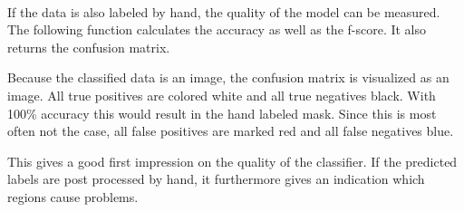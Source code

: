 \documentclass{article}
\begin{document}
    \begin{center}
    \end{center}
    { \hspace*{\fill} \\}
    
    If the data is also labeled by hand, the quality of the model can be
measured. The following function calculates the accuracy as well as the
f-score. It also returns the confusion matrix.

Because the classified data is an image, the confusion matrix is
visualized as an image. All true positives are colored white and all
true negatives black. With 100\% accuracy this would result in the hand
labeled mask. Since this is most often not the case, all false positives
are marked red and all false negatives blue.

This gives a good first impression on the quality of the classifier. If
the predicted labels are post processed by hand, it furthermore gives an
indication which regions cause problems.
\end{document}
